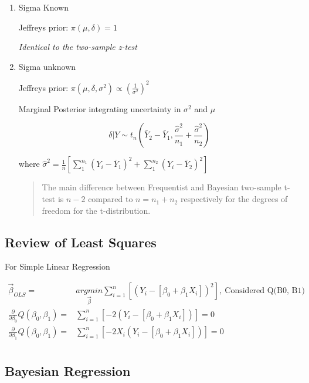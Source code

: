 \documentclass[11pt]{article}
\begin{document}
\begin{enumerate}
\item Sigma Known
\label{sec:orgc2e3487}

Jeffreys prior: \(\pi(\mu, \delta) = 1\)

\emph{Identical to the two-sample z-test}


\item Sigma unknown
\label{sec:org78695d7}

Jeffreys prior: \(\pi (\mu, \delta, \sigma^2) \propto \left( \frac{1}{\sigma^2}
\right)^2\)



Marginal Posterior integrating uncertainty in \(\sigma^2\) and \(\mu\)

$$
\delta | Y \sim t_n (\bar Y_2 - \bar Y_1, \frac{\hat \sigma^2}{n_1} + \frac{\hat
\sigma^2}{n_2})
$$

where \(\hat \sigma^2 = \frac{1}{n} \left[ \sum_{1}^{n_1} (Y_i - \bar Y_1)^2 +
\sum_{1}^{n_2} (Y_i - \bar Y_2)^2 \right]\)

\begin{quote}
The main difference between Frequentist and Bayesian two-sample t-test is \(n -
2\) compared to \(n = n_1 + n_2\) respectively for the degrees of freedom for the t-distribution.
\end{quote}
\end{enumerate}

\subsection{Review of Least Squares}
\label{sec:orge46f562}

For Simple Linear Regression

\begin{equation}
\begin{split}
\vec \beta_{OLS} = & \underset{\vec \beta}{argmin} \sum_{i = 1}^{n} \left[ (Y_i - [\beta_0 + \beta_1 X_i])^2 \right], \ \text{Considered Q(B0, B1)}\\
\frac{\partial}{\partial \beta_0} Q(\beta_0, \beta_1) = & \sum_{i = 1}^{n} \left[ -2 (Y_i - [\beta_0 + \beta_1 X_i]) \right] = 0\\
\frac{\partial}{\partial \beta_1} Q(\beta_0, \beta_1) = & \sum_{i = 1}^{n} \left[ -2 X_i (Y_i - [\beta_0 + \beta_1 X_i]) \right] = 0\\
\end{split}
\end{equation}

\subsection{Bayesian Regression}
\label{sec:org246036c}
\end{document}
